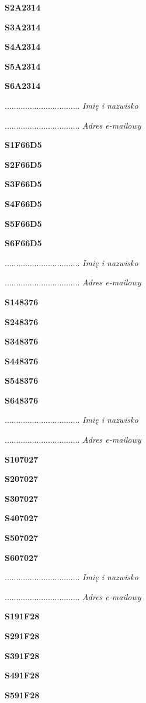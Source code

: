 \Large \textbf{S2A2314}

\Large \textbf{S3A2314}

\Large \textbf{S4A2314}

\Large \textbf{S5A2314}

\Large \textbf{S6A2314}

.................................
\textit{Imię i nazwisko}

.................................
\textit{Adres e-mailowy}

\Large \textbf{S1F66D5}

\Large \textbf{S2F66D5}

\Large \textbf{S3F66D5}

\Large \textbf{S4F66D5}

\Large \textbf{S5F66D5}

\Large \textbf{S6F66D5}

.................................
\textit{Imię i nazwisko}

.................................
\textit{Adres e-mailowy}

\Large \textbf{S148376}

\Large \textbf{S248376}

\Large \textbf{S348376}

\Large \textbf{S448376}

\Large \textbf{S548376}

\Large \textbf{S648376}

.................................
\textit{Imię i nazwisko}

.................................
\textit{Adres e-mailowy}

\Large \textbf{S107027}

\Large \textbf{S207027}

\Large \textbf{S307027}

\Large \textbf{S407027}

\Large \textbf{S507027}

\Large \textbf{S607027}

.................................
\textit{Imię i nazwisko}

.................................
\textit{Adres e-mailowy}

\Large \textbf{S191F28}

\Large \textbf{S291F28}

\Large \textbf{S391F28}

\Large \textbf{S491F28}

\Large \textbf{S591F28}

